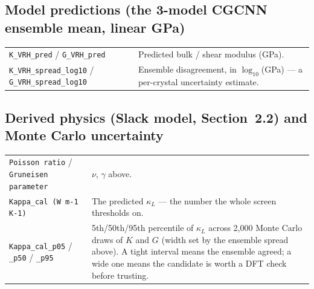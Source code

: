 \documentclass[11pt,a4paper]{article}
\newcommand{\KL}{$\kappa_L$}
\begin{document}
\subsection*{Model predictions (the 3-model CGCNN ensemble mean, linear GPa)}
\begin{center}
\begin{tabular}{p{4.4cm}p{7.6cm}}
\toprule
\texttt{K\_VRH\_pred} / \texttt{G\_VRH\_pred} & Predicted bulk / shear modulus (GPa). \\
\texttt{K\_VRH\_spread\_log10} / \texttt{G\_VRH\_spread\_log10} & Ensemble
  disagreement, in $\log_{10}$(GPa) --- a per-crystal uncertainty estimate. \\
\bottomrule
\end{tabular}
\end{center}

\subsection*{Derived physics (Slack model, Section~2.2) and Monte Carlo uncertainty}
\begin{center}
\begin{tabular}{p{4.4cm}p{7.6cm}}
\toprule
\texttt{Poisson ratio} / \texttt{Gruneisen parameter} & $\nu$, $\gamma$ above. \\
\texttt{Kappa\_cal (W m-1 K-1)} & The predicted \KL{} --- the number the whole screen thresholds on. \\
\texttt{Kappa\_cal\_p05} / \texttt{\_p50} / \texttt{\_p95} & 5th/50th/95th
  percentile of \KL{} across 2{,}000 Monte Carlo draws of $K$ and $G$ (width
  set by the ensemble spread above). A tight interval means the ensemble
  agreed; a wide one means the candidate is worth a DFT check before trusting. \\
\bottomrule
\end{tabular}
\end{center}
\end{document}
